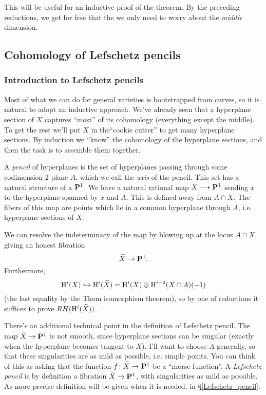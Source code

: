 This will be useful for an inductive proof of the theorem. By the preceding reductions, we get for free that the we only need to worry about the \emph{middle} dimension. 


\subsection{Cohomology of Lefschetz pencils}
\subsubsection{Introduction to Lefschetz pencils}
Most of what we can do for general varieties is bootstrapped from curves, so it is natural to adopt an inductive approach. We've already seen that a hyperplane section of $X$ captures ``most'' of its cohomology (everything except the middle). To get the rest we'll put $X$ in the``cookie cutter'' to get many hyperplane sections. By induction we ``know'' the cohomology of the hyperplane sections, and then the task is to assemble them together. 

A \emph{pencil} of hyperplanes is the set of hyperplanes passing through some codimension-2 plane $A$, which we call the \emph{axis} of the pencil. This set has a natural structure of a $\mathbf{P}^1$. We have a natural rational map $X \dashrightarrow \mathbf{P}^1$ sending $x$ to the hyperplane spanned by $x$ and $A$. This is defined away from $A \cap X$. The fibers of this map are points which lie in a common hyperplane through $A$, i.e. hyperplane sections of $X$. 

We can resolve the indeterminacy of the map by blowing up at the locus $A \cap X$, giving an honest fibration 
\[
\widetilde{X} \rightarrow \mathbf{P}^1.
\]
Furthermore, 
\[
\mathrm{H}^i(X) \hookrightarrow \mathrm{H}^i(\widetilde{X}) = \mathrm{H}^i(X) \oplus \mathrm{H}^{i-2}(X \cap A)(-1)
\]
(the last equality by the Thom isomorphism theorem), so by one of reductions it suffices to prove $RH(\mathrm{H}^i(\widetilde{X}))$. 

There's an additional technical point in the definition of Lefschetz pencil. The map $\widetilde{X} \rightarrow \mathbf{P}^1$ is not smooth, since hyperplane sections can be singular (exactly when the hyperplane becomes tangent to $X$). I'll want to choose $A$ generally, so that these singularities are as mild as possible, i.e. simple points. You can think of this as asking that the function $f \colon \widetilde{X} \rightarrow \mathbf{P}^1$ be a ``morse function''. A \emph{Lefschetz pencil} is by definition a fibration  $\widetilde{X} \rightarrow \mathbf{P}^1$, with singularities as mild as possible. As more precise definition will be given when it is needed, in \S \ref{Lefschetz_pencil}. 

